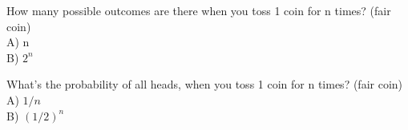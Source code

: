 \documentclass[11pt,epsfig]{article}
\begin{document}
\begin{problem}{10} How many possible outcomes are there when you toss 1 coin for n times? (fair coin)\\
\hspace{0.5in} A) n\\
\hspace{0.5in} B) $2^n$
\end{problem}

\begin{problem}{10} What's the probability of all heads, when you toss 1 coin for n times? (fair coin)\\
\hspace{0.5in} A) $1/n$\\
\hspace{0.5in} B) $(1/2)^n$
\end{problem}
\end{document}
